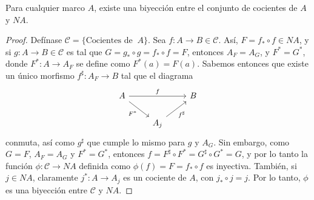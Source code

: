\begin{corollary}%
Para cualquier marco $A$, existe una biyección entre el conjunto de cocientes de $A$ y $NA$.
\end{corollary}
\begin{proof}
    Defínase $\mathcal{C}=\{\text{Cocientes de } \ A\}$. Sea $f:A\to B\in \mathcal{C}$. Así, $F=f_*\circ f\in NA$, y si $g:A\to B\in\mathcal{C}$ es tal que $G=g_*\circ g=f_*\circ f=F$, entonces $A_F=A_G$, y $F^*=G^*$, donde $F^*:A\to A_F$ se define como $F^*(a)=F(a)$. Sabemos entonces que existe un único morfismo $f^\sharp:A_F\to B$ tal que el diagrama
    \[
        \begin{tikzcd}
            A \ar[rr,"f"] \ar[dr,"F^*"'] &&  B \\
            &A_j \ar[ur,"f^\sharp"']
        \end{tikzcd}
    \]
    conmuta, así como $g^\sharp$ que cumple lo mismo para $g$ y $A_G$. Sin embargo, como $G=F$, $A_F=A_G$ y $F^*=G^*$, entonces $f=F^\sharp\circ F^*=G^\sharp\circ G^*=G$, y por lo tanto la función $\phi:\mathcal{C}\to NA$ definida como $\phi(f)=F=f_*\circ f$ es inyectiva. También, si $j\in NA$, claramente $j^*:A\to A_j$ es un cociente de $A$, con $j_*\circ j =j$. Por lo tanto, $\phi$ es una biyección entre $\mathcal{C}$ y $NA$.
\end{proof}

